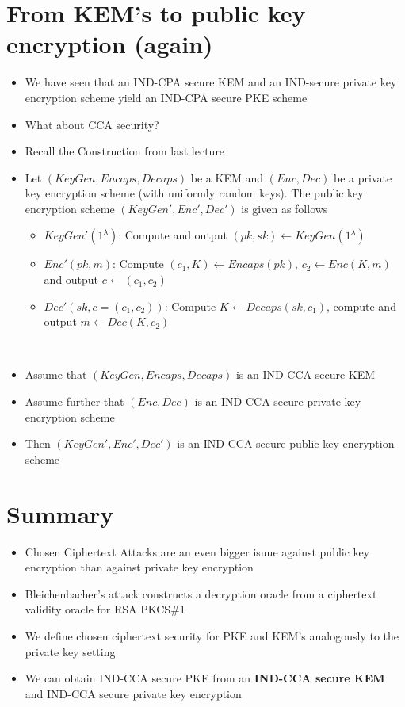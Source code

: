     \section{From KEM's to public key encryption (again)}
        \begin{itemize}
            \item We have seen that an IND-CPA secure KEM and an IND-secure private key encryption scheme yield an IND-CPA secure PKE scheme
            \item What about CCA security?
            \item Recall the Construction from last lecture
            \item Let $(KeyGen,Encaps,Decaps)$ be a KEM and $(Enc,Dec)$ be a private key encryption scheme (with uniformly random keys).
            The public key encryption scheme $(KeyGen',Enc',Dec')$ is given as follows
                \begin{itemize}
                    \item $KeyGen'(1^{\lambda})$: Compute and output $(pk,sk) \leftarrow KeyGen(1^{\lambda})$
                    \item $Enc'(pk,m)$: Compute $(c_1,K) \leftarrow Encaps(pk)$, $c_2 \leftarrow Enc(K,m)$ and output $c \leftarrow (c_1,c_2)$
                    \item $Dec'(sk,c=(c_1,c_2))$: Compute $K \leftarrow Decaps(sk,c_1)$, compute and output $m \leftarrow Dec(K,c_2)$
                \end{itemize}
        \end{itemize}
    
    \begin{theorem}\label{thm8.4}\ 
        \begin{itemize}
            \item Assume that $(KeyGen,Encaps,Decaps)$ is an IND-CCA secure KEM
            \item Assume further that $(Enc,Dec)$ is an IND-CCA secure private key encryption scheme
            \item Then $(KeyGen',Enc',Dec')$ is an IND-CCA secure public key encryption scheme
        \end{itemize}
    \end{theorem}
    
    \section{Summary}
        \begin{itemize}
            \item Chosen Ciphertext Attacks are an even bigger isuue against public key encryption than against private key encryption
            \item Bleichenbacher's attack constructs a decryption oracle from a ciphertext validity oracle for RSA PKCS$\#$1
            \item We define chosen ciphertext security for PKE and KEM's analogously to the private key setting
            \item We can obtain IND-CCA secure PKE from an \textbf{IND-CCA secure KEM} and IND-CCA secure private key encryption
        \end{itemize}
    
